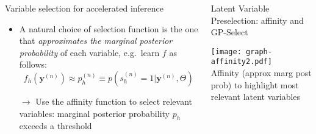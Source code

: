 \documentclass[final]{beamer}
\renewcommand{\vec}[1]{{\mathbf{#1}}}
\newcommand{\highlight}[1]{\textcolor{blocktbgn}{#1}}
\renewcommand{\vec}[1]{{\mathbf{#1}}}
\begin{document}
\begin{frame}{}
\begin{columns}[t]
\begin{column}{.33\linewidth}
\begin{block}{Variable selection for accelerated inference}
\begin{itemize}
            \item A natural choice of \highlight{selection function} is the one that \highlight{\emph{approximates the marginal posterior probability}}
                of each variable, e.g.\ learn \highlight{$f$} as follows:
                \begin{equation}
                \label{eq:affinity}
                f_h(\vec{y}^{(n)}) %
                    \approx p^{(n)}_h \equiv p(s^{(n)}_h = 1|\vec{y}^{(n)}, \Theta)
                \end{equation}

        \highlight{$\rightarrow$} Use the affinity function to \highlight{select relevant variables}: marginal posterior probability \highlight{$p_h$ exceeds a threshold}
         \end{itemize}
    \vspace{-.7cm}
    \end{block}

  \end{column}
  \begin{column}{.35\linewidth}

    \begin{block}{Latent Variable Preselection: affinity and GP-Select}
          \vspace{-.4cm}
            \begin{center} 
 
            \vspace{.1cm}
            \texttt{[image: graph-affinity2.pdf]}\\
           \textcolor{blocktbgn}{Affinity (approx marg post prob) to highlight most relevant latent variables}
            \end{center}
       
        
         \vspace{-.05cm}
           \begin{itemize}
            \setlength{\labelsep}{0.5em}


\end{itemize}
\end{block}
\end{column}
\end{columns}
\end{frame}
\end{document}
